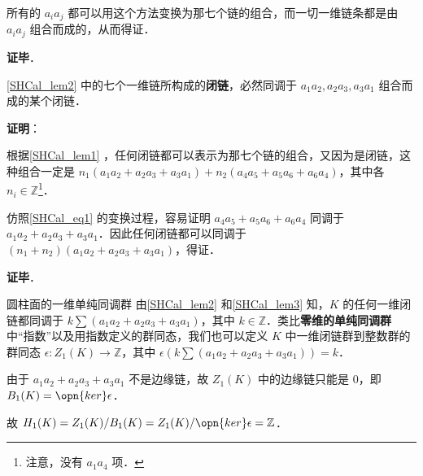 所有的 $a_ia_j$ 都可以用这个方法变换为那七个链的组合，而一切一维链条都是由 $a_ia_j$ 组合而成的，从而得证．

\textbf{证毕}．

\begin{lemma}{}\label{SHCal_lem3}
\autoref{SHCal_lem2} 中的七个一维链所构成的\textbf{闭链}，必然同调于 $a_1a_2, a_2a_3, a_3a_1$ 组合而成的某个闭链．
\end{lemma}

\textbf{证明}：


根据\autoref{SHCal_lem1} ，任何闭链都可以表示为那七个链的组合，又因为是闭链，这种组合一定是 $n_1(a_1a_2+a_2a_3+a_3a_1)+n_2(a_4a_5+a_5a_6+a_6a_4)$，其中各 $n_i\in\mathbb{Z}$\footnote{注意，没有 $a_1a_4$ 项．}．

仿照\autoref{SHCal_eq1} 的变换过程，容易证明 $a_4a_5+a_5a_6+a_6a_4$ 同调于 $a_1a_2+a_2a_3+a_3a_1$．因此任何闭链都可以同调于 $(n_1+n_2)(a_1a_2+a_2a_3+a_3a_1)$，得证．


\textbf{证毕}．

\begin{corollary}{圆柱面的一维单纯同调群}
由\autoref{SHCal_lem2} 和\autoref{SHCal_lem3} 知，$K$ 的任何一维闭链都同调于 $k\sum (a_1a_2+a_2a_3+a_3a_1)$，其中 $k\in\mathbb{Z}$．类比\textbf{零维的单纯同调群}中“指数”以及用指数定义的群同态，我们也可以定义 $K$ 中一维闭链群到整数群的群同态 $\epsilon: Z_1(K)\to \mathbb{Z}$，其中 $\epsilon(k\sum (a_1a_2+a_2a_3+a_3a_1))=k$．

由于 $a_1a_2+a_2a_3+a_3a_1$ 不是边缘链，故 $Z_1(K)$ 中的边缘链只能是 $0$，即 $B_1(K)=\opn{ker}\epsilon$．

故 $H_1(K)=Z_1(K)/B_1(K)=Z_1(K)/\opn{ker}\epsilon=\mathbb{Z}$．
\end{corollary}



















